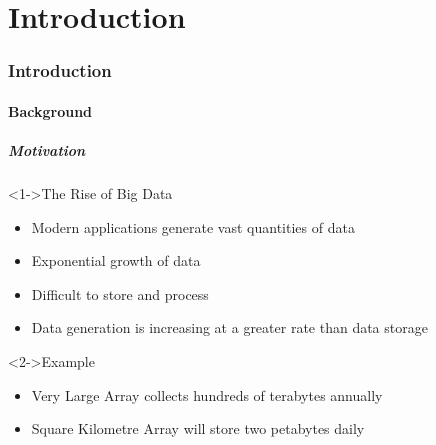 \part{Introduction}

\section{Introduction}

\subsection{Background}

\begin{frame}
  \frametitle{Motivation}

  \begin{block}<1->{The Rise of Big Data}
    \begin{itemize}
      \item Modern applications generate vast quantities of data
      \item Exponential growth of data
      \item Difficult to store and process
      \item Data generation is increasing at a greater rate than data storage
    \end{itemize}
  \end{block}

  \begin{block}<2->{Example}
    \begin{itemize}
      \item Very Large Array collects hundreds of terabytes annually
      \item Square Kilometre Array will store two petabytes daily
    \end{itemize}
  \end{block}
\end{frame}

